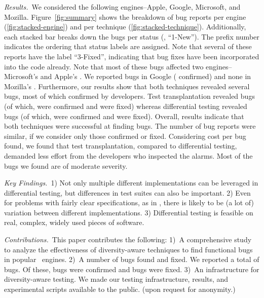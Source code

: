 \documentclass[sigconf,review, anonymous]{acmart}
\begin{document}
\emph{Results.}~We considered the following engines--Apple, Google,
Microsoft, and Mozilla. Figure~\ref{fig:summary} shows the breakdown
of bug reports per engine (\ref{fig:stacked-engine}) and per technique
(\ref{fig:stacked-technique}). Additionally, each stacked bar breaks
down the bugs per status (\eg{}, ``1-New''). The prefix number
indicates the ordering that status labels are assigned. Note that
several of these reports have the label ``3-Fixed'', indicating that
bug fixes have been incorporated into the code already. Note that most
of these bugs affected two engines--Microsoft's \chakra{} and Apple's
\jsc{}.  We reported \noBugsBugsReportedGoogle{} bugs in Google
\veight{} (\noBugsBugsConfirmedGoogle{} confirmed) and none in
Mozilla's \smonkey{}.  Furthermore, our results show that both
techniques revealed several bugs, most of which confirmed by
developers. Test transplantation revealed \noBugsTransplantation{}
bugs (of which, \noBugsTransplantationConfirmed{} were confirmed and
\noBugsTransplantationFixed{} were fixed) whereas differential testing
revealed \noBugsDifferentialTesting{} bugs (of which,
\noBugsDifferentialTestingConfirmed{} were confirmed and
\noBugsDifferentialTestingFixed{} were fixed).  Overall, results
indicate that both techniques were successful at finding bugs. The
number of bug reports were similar, if we consider only those
confirmed or fixed. Considering cost per bug found, we found that test
transplantation, compared to differential testing, demanded less
effort from the developers who inspected the alarms. Most of the bugs
we found are of moderate severity.


\emph{Key Findings.}~1) Not only multiple different implementations
can be leveraged in differential testing, but differences in test
suites can also be important. 2) Even for problems with fairly clear
specifications, as in \javascript{}, there is likely to be (a lot of)
variation between different implementations. 3) Differential testing
is feasible on real, complex, widely used pieces of software.


\emph{Contributions.}~This paper contributes the following: 1)~A
comprehensive study to analyze the effectiveness of diversity-aware
techniques to find functional bugs in popular \javascript\ engines.
2)~A number of bugs found and fixed. We reported a total of
\totalBugsReported{} bugs. Of these, \totalBugsConfirmed{} bugs were
confirmed and \totalBugsFixed{} bugs were fixed. 3)~An infrastructure
for diversity-aware testing. We made our testing infrastructure,
results, and experimental scripts available to the public. (upon
request for anonymity.)
\end{document}
